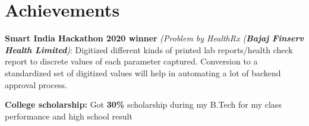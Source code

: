 \section{Achievements}
    \begin{itemize}[leftmargin=0.15in, label={}]
	\small{\item{
		\textbf{Smart India Hackathon 2020 winner }{\textit{(Problem by HealthRx (\textbf{Bajaj Finserv Health Limited})}: Digitized different kinds of printed lab reports/health check report to discrete values of each parameter captured. Conversion to a standardized set of digitized values will help in automating a lot of backend approval process.} \\
	}}
    \small{\item{
        \textbf{College scholarship: }{Got \textbf{30\%} scholarship during my B.Tech for my class performance and high school result}
    }}
    \end{itemize}